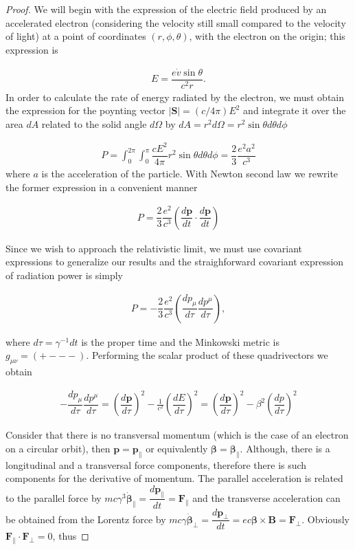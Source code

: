 \begin{proof}
We will begin with the expression of the electric field produced by an accelerated electron (considering the velocity still small compared to the velocity of light) at a point of coordinates $(r,\phi,\theta)$, with the electron on the origin; this expression is

\begin{align*}
E = \dfrac{e\dot{v}\sin \theta}{c^2 r}.
\end{align*}
In order to calculate the rate of energy radiated by the electron, we must obtain the expression for the poynting vector $|\mathbf{S}| = (c/4\pi)E^2$ and integrate it over the area $dA$ related to the solid angle $d\Omega$ by $dA = r^2d\Omega = r^2\sin\theta d\theta d\phi$

\begin{align*}
P = \int_{0}^{2\pi}\int_{0}^{\pi}\dfrac{cE^2}{4\pi}r^2\sin\theta d\theta d\phi = \dfrac{2}{3}\dfrac{e^2a^{2}}{c^3}
\end{align*}
where $a$ is the acceleration of the particle. With Newton second law we rewrite the former expression in a convenient manner

\begin{align*}
P = \dfrac{2}{3}\dfrac{e^2}{c^3} \left(\dfrac{d\mathbf{p}}{dt}\cdot\dfrac{d\mathbf{p}}{dt}\right)
\end{align*}

Since we wish to approach the relativistic limit, we must use covariant expressions to generalize our results and the straighforward covariant expression of radiation power is simply

\begin{align*}
P = -\dfrac{2}{3}\dfrac{e^2}{c^3} \left(\dfrac{d{p_\mu}}{d\tau}\dfrac{dp^\mu}{d\tau}\right),
\end{align*}

where $d\tau = \gamma^{-1}dt$ is the proper time and the Minkowski metric is $g_{\mu \nu} = (+ - - -)$. Performing the scalar product of these quadrivectors we obtain

\begin{align*}
-\dfrac{d{p_\mu}}{d\tau}\dfrac{dp^\mu}{d\tau} = \left(\dfrac{d\mathbf{p}}{d\tau}\right)^2 - \frac{1}{c^2}\left(\dfrac{dE}{d\tau}\right)^2 = \left(\dfrac{d\mathbf{p}}{d\tau}\right)^2 - \beta^2\left(\dfrac{dp}{d\tau}\right)^2
\end{align*}

Consider that there is no transversal momentum (which is the case of an electron on a circular orbit), then $\boldsymbol{{p}} = \boldsymbol{p}_\parallel$ or equivalently $\boldsymbol{\beta} = \boldsymbol{\beta_\parallel}$. Although, there is a longitudinal and a transversal force components, therefore
 there is such components for the derivative of momentum. The parallel acceleration is related to the parallel force by $mc\gamma^3\boldsymbol{\dot{\beta}}_\parallel = \dfrac{d\mathbf{p}_\parallel}{dt} = \mathbf{F}_\parallel$ and the transverse acceleration can be obtained from the Lorentz force by
 $mc \gamma\boldsymbol{\dot{\beta}}_\perp = \dfrac{d\boldsymbol{p}_{\perp}}{dt} = ec\boldsymbol{{\beta}} \times \mathbf{B} = \mathbf{F}_\perp$. Obviously $\mathbf{F}_\parallel \cdot \mathbf{F}_\perp = 0$, thus


\end{proof}
